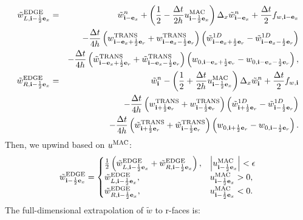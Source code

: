 \documentclass[11pt]{article}
\def\half  {\frac{1}{2}}
\def\dt    {\Delta t}
\def\edge  {\rm EDGE}
\def\mac   {\rm MAC}
\def\trans {\rm TRANS}
\def\eb    {{\bf e}}
\def\ib    {{\bf i}}
\def\wt    {\tilde{w}}
\begin{document}
\begin{eqnarray}
\wt_{L,\ib-\half\eb_x}^{\edge} &=& \wt_{\ib-\eb_x}^n + \left(\half - \frac{\dt}{2h}u_{\ib-\half\eb_x}^{\mac}\right)\Delta_x \wt_{\ib-\eb_x}^n + \frac{\dt}{2}f_{w,\ib-\eb_x} \nonumber \\
&& - \frac{\dt}{4h}\left(w_{\ib-\eb_x+\half\eb_r}^{\trans}+w_{\ib-\eb_x-\half\eb_r}^{\trans}\right)\left(\wt_{\ib-\eb_x+\half\eb_r}^{1D} - \wt_{\ib-\eb_x-\half\eb_r}^{1D}\right) \nonumber \\
&& - \frac{\dt}{4h}\left(\wt_{\ib-\eb_x+\half\eb_r}^{\trans}+\wt_{\ib-\eb_x-\half\eb_r}^{\trans}\right)\left(w_{0,\ib-\eb_x+\half\eb_r}-w_{0,\ib-\eb_x-\half\eb_r}\right), \label{wt_L x-edge} \\
\wt_{R,\ib-\half\eb_x}^{\edge} &=& \wt_{\ib}^n - \left(\half + \frac{\dt}{2h}u_{\ib-\half\eb_x}^{\mac}\right)\Delta_x \wt_{\ib}^n + \frac{\dt}{2}f_{w,\ib} \nonumber \\
&& - \frac{\dt}{4h}\left(w_{\ib+\half\eb_r}^{\trans}+w_{\ib-\half\eb_r}^{\trans}\right)\left(\wt_{\ib+\half\eb_r}^{1D} - \wt_{\ib-\half\eb_r}^{1D}\right) \nonumber \\
&& - \frac{\dt}{4h}\left(\wt_{\ib+\half\eb_r}^{\trans}+\wt_{\ib-\half\eb_r}^{\trans}\right)\left(w_{0,\ib+\half\eb_r}-w_{0,\ib-\half\eb_r}\right). \label{wt_R x-edge}
\end{eqnarray}
Then, we upwind based on $u^{\mac}$:
\begin{equation}
\wt_{\ib-\half\eb_x}^{\edge} =
\begin{cases}
\half\left(\wt_{L,\ib-\half\eb_x}^{\edge} + \wt_{R,\ib-\half\eb_x}^{\edge}\right), & \left|u^{\mac}_{\ib-\half\eb_x}\right| < \epsilon \\
\wt_{L,\ib-\half\eb_x}^{\edge}, & u^{\mac}_{\ib-\half\eb_x} > 0, \\
\wt_{R,\ib-\half\eb_x}^{\edge}, & u^{\mac}_{\ib-\half\eb_x} < 0.
\end{cases}
\end{equation}
The full-dimensional extrapolation of $\wt$ to r-faces is:
\end{document}
